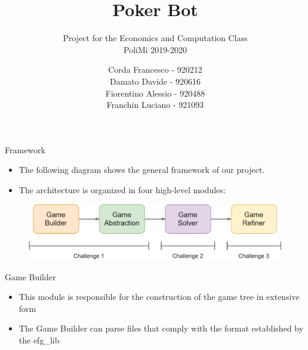 \documentclass[11pt]{beamer}
\author{Corda Francesco - 920212\\
		Damato Davide - 920616\\
		Fiorentino Alessio - 920488\\
		Franchin Luciano - 921093}
\title{Poker Bot}
\subtitle{Project for the Economics and Computation Class\\
		PoliMi 2019-2020}
\begin{document}
\begin{frame}
\titlepage
\end{frame}


\begin{frame}{Framework}
\begin{itemize}
\item The following diagram shows the general framework of our project.
\item The architecture is organized in four high-level modules:
\end{itemize}
\begin{figure}[hbtp]
		\centering
		\includegraphics[scale=0.2]{images/img_01.png}
\end{figure}
\end{frame}

\begin{frame}{Game Builder}
\begin{itemize}
\item This module is responsible for the construction of the game tree in extensive form
\item The Game Builder can parse files that comply with the format established by the efg\_lib
\end{itemize}
\end{frame}
\end{document}
